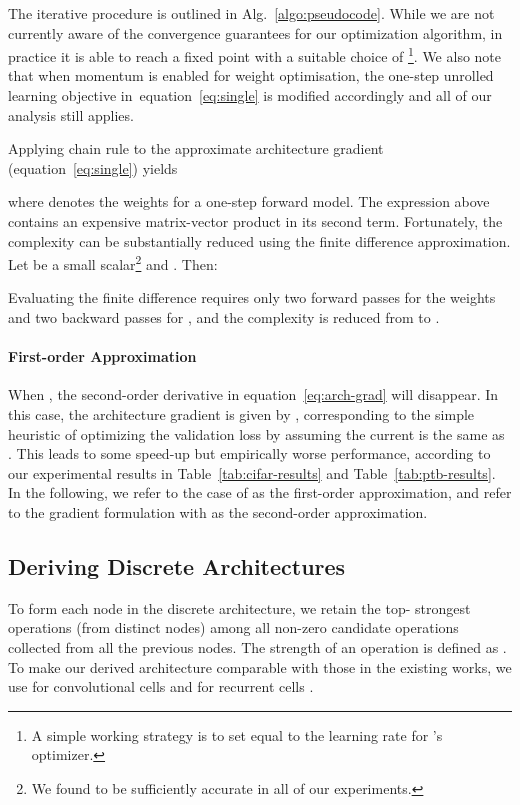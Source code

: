 \documentclass{article}
\def\eqref#1{equation~\ref{#1}}
\begin{document}
The iterative procedure is outlined in Alg.~\ref{algo:pseudocode}.
While we are not currently aware of the convergence guarantees for our optimization algorithm, in practice it is able to reach a fixed point with a suitable choice of \footnote{A simple working strategy is to set  equal to the learning rate for 's optimizer.}.
We also note that
when momentum is enabled for weight optimisation,
the one-step unrolled learning objective in~\eqref{eq:single} is modified accordingly and all of our analysis still applies.

Applying chain rule to the approximate architecture gradient (\eqref{eq:single}) yields

where  denotes the weights for a one-step forward model.
The expression above contains an expensive matrix-vector product 
in its second term.
Fortunately,
the complexity can be substantially reduced using the finite difference approximation.
Let  be a small scalar\footnote{We found  to be sufficiently accurate in all of our experiments.} and
. Then:

Evaluating the finite difference requires only two forward passes for the weights and two backward passes for ,
and the complexity is reduced from  to .

\paragraph{First-order Approximation}
When ,
the second-order derivative in \eqref{eq:arch-grad}
will disappear.
In this case,
the architecture gradient is given by , corresponding to the simple heuristic of optimizing the validation loss by assuming the current  is the same as .
This leads to some speed-up but empirically worse performance, according to our experimental results in Table~\ref{tab:cifar-results} and Table~\ref{tab:ptb-results}.
In the following,
we refer to the case of  as the first-order approximation,
and refer to the gradient formulation with  as the second-order approximation.


\subsection{Deriving Discrete Architectures}

To form each node in the discrete architecture,
we retain the top- strongest operations (from distinct nodes) among all non-zero candidate operations collected from all the previous nodes.
The strength of an operation is defined as .
To make our derived architecture comparable with those in the existing works, we use  for convolutional cells \citep{zoph2017learning, liu2017progressive, real2018regularized} and  for recurrent cells \citep{pham2018efficient}.
\end{document}
